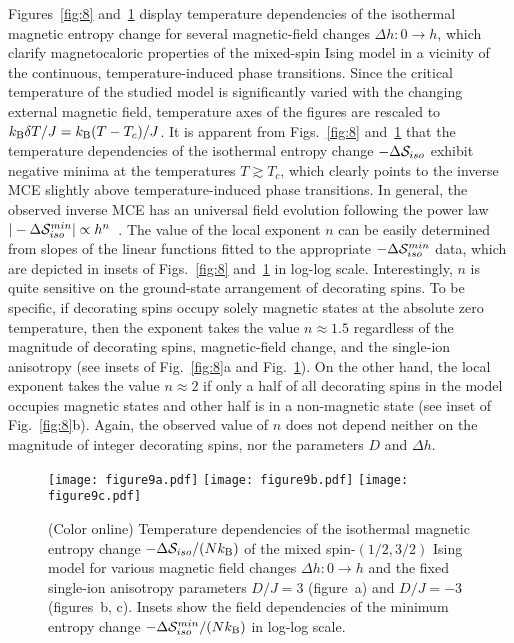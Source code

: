 \documentclass[final,5p,times,sort&compress]{elsarticle}
\begin{document}
Figures~\ref{fig:8} and~\ref{fig:9} display temperature dependencies of the isothermal magnetic entropy change for several magnetic-field changes $\Delta h\!\!:0\to h$, which clarify magnetocaloric properties of the mixed-spin Ising model in a vicinity of the continuous, temperature-induced phase transitions. Since the critical temperature of the studied model is significantly varied with the changing external magnetic field, temperature axes of the figures are rescaled to $k_{\rm B}\delta T/J = k_{\rm B}(T - T_c)/J$.
It is apparent from Figs.~\ref{fig:8} and~\ref{fig:9} that the temperature dependencies of the isothermal entropy change $-\Delta {\cal S}_{iso}$ exhibit negative minima at the temperatures $T\gtrsim T_c$, which clearly points to the inverse MCE slightly above temperature-induced phase transitions. In general, the observed inverse MCE has an universal field evolution following the power law $|-\Delta {\cal S}_{iso}^{min}|\propto h^n$~\cite{Fra06, Fra09a, Fra09b, Fra10}. The value of the local exponent $n$ can be easily determined from slopes of the linear functions fitted to the appropriate $-\Delta {\cal S}_{iso}^{min}$ data, which are depicted in insets of Figs.~\ref{fig:8} and~\ref{fig:9} in log-log scale. Interestingly,  $n$ is quite sensitive on the ground-state arrangement of decorating spins. To be specific, if decorating spins occupy solely magnetic states at the absolute zero temperature, then the exponent takes the value $n\approx 1.5$ regardless of the magnitude of decorating spins, magnetic-field change, and the single-ion anisotropy (see insets of Fig.~\ref{fig:8}a and Fig.~\ref{fig:9}). On the other hand, the local exponent takes the value $n\approx 2$ if only a half of all decorating spins in the model occupies magnetic states and other half is in a non-magnetic state (see inset of Fig.~\ref{fig:8}b). Again, the observed value of $n$ does not depend neither on the magnitude of integer decorating spins, nor the parameters $D$ and $\Delta h$.
\begin{figure}[t!]
\vspace{0.25cm}
\centering
  \texttt{[image: figure9a.pdf]}\vspace{1mm}
  \texttt{[image: figure9b.pdf]}\vspace{1mm}
  \texttt{[image: figure9c.pdf]}
\vspace{-0.15cm}
\caption{(Color online) Temperature dependencies of the isothermal magnetic entropy change $-\Delta{\cal S}_{iso}/(Nk_{\rm B})$ of the mixed spin-$(1/2,3/2)$ Ising model for various magnetic field changes $\Delta h\!:0\to h$ and the fixed single-ion anisotropy parameters $D/J = 3$ (figure~a) and $D/J = -3$ (figures~b, c). Insets show the field dependencies of the minimum entropy change $-\Delta{\cal S}_{iso}^{min}/(Nk_{\rm B})$ in log-log scale.}
\label{fig:9}
\vspace{-0.75cm}
\end{figure}
\end{document}
